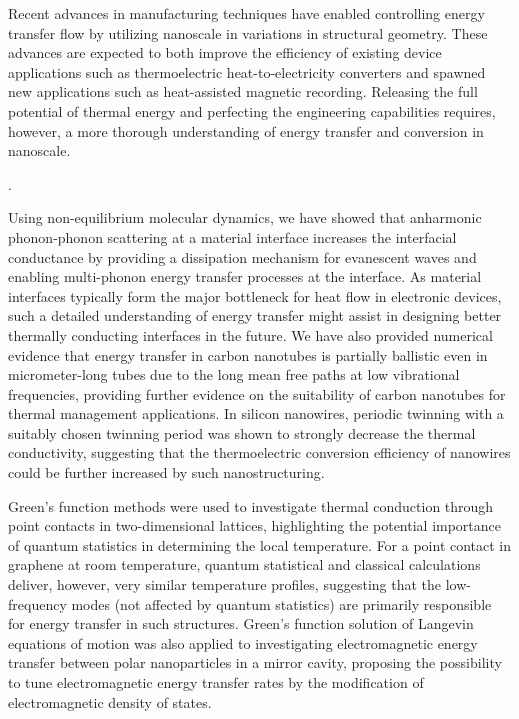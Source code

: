 
Recent advances in manufacturing techniques have enabled controlling energy transfer flow by utilizing nanoscale in variations in structural geometry. These advances are expected to both improve the efficiency of existing device applications such as thermoelectric heat-to-electricity converters and spawned new applications such as heat-assisted magnetic recording. Releasing the full potential of thermal energy and perfecting the engineering capabilities requires, however, a more thorough understanding of energy transfer and conversion in nanoscale.

. %

Using non-equilibrium molecular dynamics, we have showed that anharmonic phonon-phonon scattering at a material interface increases the interfacial conductance by providing a dissipation mechanism for evanescent waves and enabling multi-phonon energy transfer processes at the interface. As material interfaces typically form the major bottleneck for heat flow in electronic devices, such a detailed understanding of energy transfer might assist in designing better thermally conducting interfaces in the future. We have also provided numerical evidence that energy transfer in carbon nanotubes is partially ballistic even in micrometer-long tubes due to the long mean free paths at low vibrational frequencies, providing further evidence on the suitability of carbon nanotubes for thermal management applications. In silicon nanowires, periodic twinning with a suitably chosen twinning period was shown to strongly decrease the thermal conductivity, suggesting that the thermoelectric conversion efficiency of nanowires could be further increased by such nanostructuring. 

Green's function methods were used to investigate thermal conduction through point contacts in two-dimensional lattices, highlighting the potential importance of quantum statistics in determining the local temperature. For a point contact in graphene at room temperature, quantum statistical and classical calculations deliver, however, very similar temperature profiles, suggesting that the low-frequency modes (not affected by quantum statistics) are primarily responsible for energy transfer in such structures. Green's function solution of Langevin equations of motion was also applied to investigating electromagnetic energy transfer between polar nanoparticles in a mirror cavity, proposing the possibility to tune electromagnetic energy transfer rates by the modification of electromagnetic density of states. 

